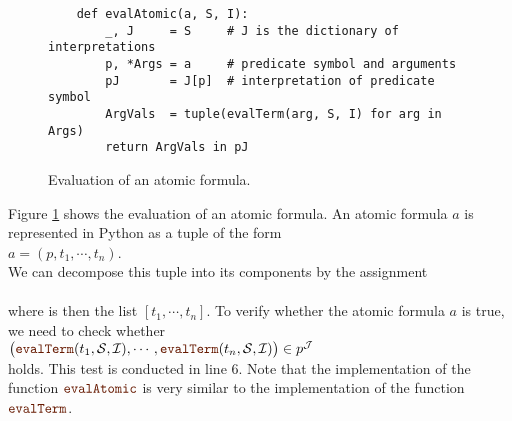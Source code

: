 \begin{figure}[!ht]
\centering
\begin{verbatim}
    def evalAtomic(a, S, I):
        _, J     = S     # J is the dictionary of interpretations
        p, *Args = a     # predicate symbol and arguments
        pJ       = J[p]  # interpretation of predicate symbol
        ArgVals  = tuple(evalTerm(arg, S, I) for arg in Args)
        return ArgVals in pJ
\end{verbatim}
\vspace*{-0.3cm}
\caption{Evaluation of an atomic formula.}
\label{fig:evalAtomic.ipynb}
\end{figure}

Figure \ref{fig:evalAtomic.ipynb} shows the evaluation of an atomic formula. An atomic formula $a$ 
is represented in Python as a tuple of the form
\\[0.2cm]
\hspace*{1.3cm}
$a = (p, t_1,\cdots,t_n)$.
\\[0.2cm]
We can decompose this tuple into its components by the assignment
\\[0.2cm]
\hspace*{1.3cm}
\\[0.2cm]
where  is then the list $[t_1,\cdots,t_n]$.
To verify whether the atomic formula $a$ is true, we need to check whether
\\[0.2cm]
\hspace*{1.3cm}
$\bigl(\mytt{evalTerm}(t_1,\mathcal{S}, \mathcal{I}), \cdots, \mytt{evalTerm}(t_n,\mathcal{S},\mathcal{I})\bigr)\in p^\mathcal{J}$
\\[0.2cm]
holds. This test is conducted in line 6. Note that the implementation of the function
$\mytt{evalAtomic}$ is very similar to the implementation of the function $\mytt{evalTerm}$.



